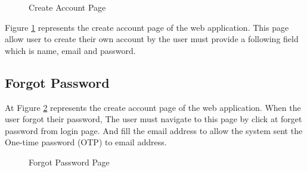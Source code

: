 \documentclass[12pt,oneside,openright,a4paper]{cpe-english-project}
\begin{document}
\begin{figure}[!h]
\centering
{}
\caption{Create Account Page}\label{fig:create-acc}
\end{figure}

Figure \ref{fig:create-acc} represents the create account page of the web application. This page allow user to create their own account by the user must provide a following field which is name, email and password.

\subsection{Forgot Password}

At Figure \ref{fig:Forgot-Password} represents the create account page of the web application. When the user forgot their password, The user must navigate to this page by click at forget password from login page. And fill the email address to allow the system sent the One-time password (OTP) to email address. 


\begin{figure}[!h]
\centering
{}
\caption{Forgot Password Page}\label{fig:Forgot-Password}
\end{figure}
\end{document}
